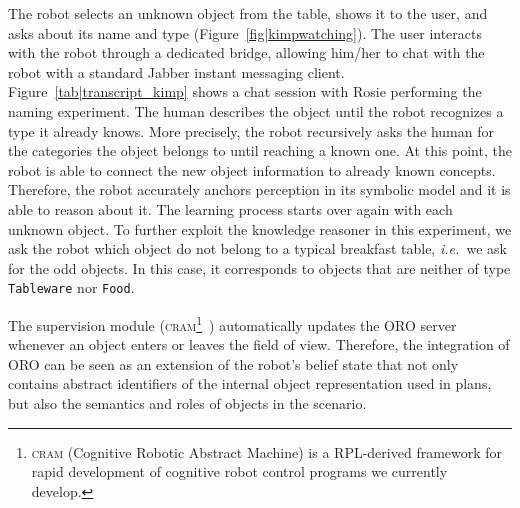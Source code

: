 \documentclass[twocolumn]{svjour3}
\newcommand{\concept}[1]{{\footnotesize \texttt{#1}}}
\newcommand{\ie}{{\textit{i.e.~}}}
\begin{document}
The robot selects an unknown object from the table, shows it to the user, and
asks about its name and type (Figure~\ref{fig|kimpwatching}). The user
interacts with the robot through a dedicated bridge, allowing him/her to chat with
the robot with a standard Jabber instant messaging client.
Figure~\ref{tab|transcript_kimp} shows a chat session with Rosie performing the
naming experiment. The human describes the object until the robot recognizes a
type it already knows. More precisely, the robot recursively asks the human for the categories the object belongs to until reaching a known one. At this point, the robot is able to connect the new object information to already known concepts. Therefore, the robot
accurately anchors perception in its symbolic model and it is able to reason
about it.  The learning process starts over again with each unknown object. To
further exploit the knowledge reasoner in this experiment, we ask the robot
which object do not belong to a typical breakfast table, \ie we ask for the odd
objects. In this case, it corresponds to objects that are neither of type
\concept{Tableware} nor \concept{Food}. 

The supervision module (\textsc{cram}\footnote{\textsc{cram} (Cognitive Robotic
Abstract Machine) is a RPL-derived framework for rapid development of cognitive
robot control programs we currently develop.}~\cite{Beetz2010}) automatically
updates the ORO server whenever an object enters or leaves the field of view.
Therefore, the integration of ORO can be seen as an extension of
the robot's belief state that not only contains abstract identifiers
of the internal object representation used in plans, but also the
semantics and roles of objects in the scenario.
\end{document}
